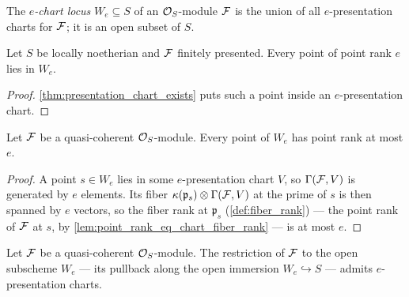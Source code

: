 \begin{definition}
  \label{def:chart_locus}
  \leanok
  The \emph{\(e\)-chart locus} \(W_e \subseteq S\) of an \(\mathcal{O}_S\)-module
  \(\mathcal{F}\) is the union of all \(e\)-presentation charts for \(\mathcal{F}\); it is an
  open subset of \(S\).
\end{definition}

\begin{lemma}
  \label{lem:chart_locus_contains_rank_locus}
  \leanok
  Let \(S\) be locally noetherian and \(\mathcal{F}\) finitely presented.  Every
  point of point rank \(e\) lies in \(W_e\).
\end{lemma}

\begin{proof}
  \leanok
  \cref{thm:presentation_chart_exists} puts such a point inside an
  \(e\)-presentation chart.
\end{proof}

\begin{lemma}
  \label{lem:chart_locus_rank_bound}
  \leanok
  Let \(\mathcal{F}\) be a quasi-coherent \(\mathcal{O}_S\)-module.  Every point of \(W_e\)
  has point rank at most \(e\).
\end{lemma}

\begin{proof}
  \leanok
  A point \(s \in W_e\) lies in some \(e\)-presentation chart \(V\), so
  \(\Gamma(\mathcal{F}, V)\) is generated by \(e\) elements.  Its fiber
  \(\kappa(\mathfrak p_s) \otimes \Gamma(\mathcal{F}, V)\) at the prime of \(s\) is
  then spanned by \(e\) vectors, so the fiber rank at \(\mathfrak p_s\)
  (\cref{def:fiber_rank}) --- the point rank of \(\mathcal{F}\) at \(s\), by
  \cref{lem:point_rank_eq_chart_fiber_rank} --- is at most \(e\).
\end{proof}

\begin{lemma}
  \label{lem:charts_cover_chart_locus}
  \leanok
  Let \(\mathcal{F}\) be a quasi-coherent \(\mathcal{O}_S\)-module.  The restriction of
  \(\mathcal{F}\) to the open subscheme \(W_e\) --- its pullback along the open
  immersion \(W_e \hookrightarrow S\) --- admits \(e\)-presentation charts.
\end{lemma}

